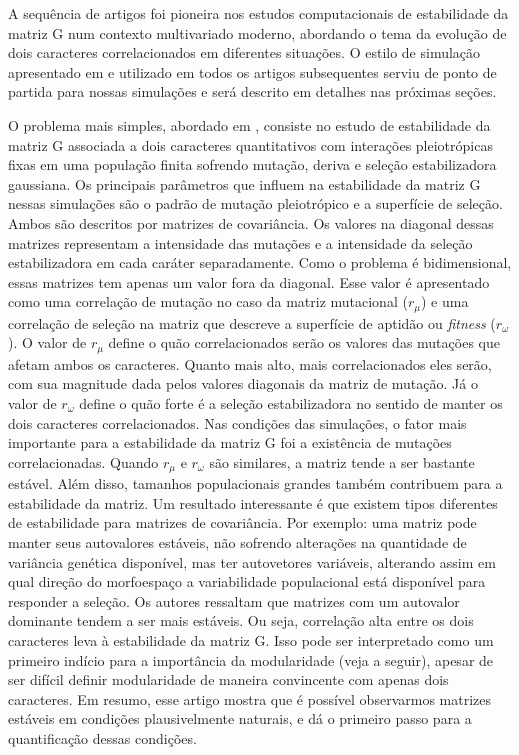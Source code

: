 A sequência de artigos \cite{Jones2003, Jones2004, Jones2007} foi
pioneira nos estudos computacionais de estabilidade da matriz G num
contexto multivariado moderno, abordando o tema da evolução de dois
caracteres correlacionados em diferentes situações.
O estilo de simulação apresentado em \cite{Jones2003} e utilizado em
todos os artigos subsequentes serviu de ponto de partida para nossas
simulações e será descrito em detalhes nas próximas seções.

O problema mais simples, abordado em \cite{Jones2003}, consiste no
estudo de estabilidade da matriz G associada a dois caracteres
quantitativos com interações pleiotrópicas fixas em uma população finita
sofrendo mutação, deriva e seleção estabilizadora gaussiana.
Os principais parâmetros que influem na estabilidade da matriz G nessas
simulações são o padrão de mutação pleiotrópico e a superfície de
seleção.
Ambos são descritos por matrizes de covariância.
Os valores na diagonal dessas matrizes representam a intensidade das
mutações e a intensidade da seleção estabilizadora em cada caráter
separadamente.
Como o problema é bidimensional, essas matrizes tem apenas um valor fora
da diagonal.
Esse valor é apresentado como uma correlação de mutação no caso da
matriz mutacional ($r_\mu$) e uma correlação de seleção na matriz que
descreve a superfície de aptidão ou {\it fitness} ($r_\omega$).
O valor de $r_\mu$ define o quão correlacionados serão os valores das
mutações que afetam ambos os caracteres.
Quanto mais alto, mais correlacionados eles serão, com sua magnitude
dada pelos valores diagonais da matriz de mutação.
Já o valor de $r_\omega$ define o quão forte é a seleção estabilizadora
no sentido de manter os dois caracteres correlacionados.
Nas condições das simulações, o fator mais importante para a
estabilidade da matriz G foi a existência de mutações correlacionadas.
Quando $r_\mu$ e $r_\omega$ são similares, a matriz tende a ser bastante
estável.
Além disso, tamanhos populacionais grandes também contribuem para a
estabilidade da matriz.
Um resultado interessante é que existem tipos diferentes de estabilidade
para matrizes de covariância.
Por exemplo: uma matriz pode manter seus autovalores estáveis, não
sofrendo alterações na quantidade de variância genética disponível, mas
ter autovetores variáveis, alterando assim em qual direção do
morfoespaço a variabilidade populacional está disponível para responder
a seleção.
Os autores ressaltam que matrizes com um autovalor dominante tendem a
ser mais estáveis.
Ou seja, correlação alta entre os dois caracteres leva à estabilidade da
matriz G.
Isso pode ser interpretado como um primeiro indício para a importância
da modularidade (veja a seguir), apesar de ser difícil definir
modularidade de maneira convincente com apenas dois caracteres.
Em resumo, esse artigo mostra que é possível observarmos matrizes
estáveis em condições plausivelmente naturais, e dá o primeiro passo
para a quantificação dessas condições.

